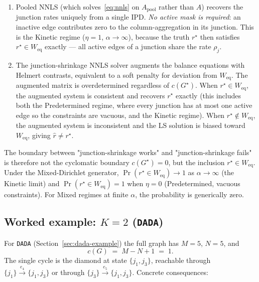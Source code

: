 \documentclass[11pt, a4paper]{article}
\newcommand{\rstar}{r^{\star}}
\newcommand{\Gstar}{G^{\star}}
\begin{document}
\begin{enumerate}[leftmargin=*, itemsep=2pt, topsep=2pt]
  \item Pooled NNLS (which solves~\eqref{eq:nnls} on $A_{\mathrm{pool}}$ rather than $A$) recovers the junction rates uniquely from a single IPD. \emph{No active mask is required}: an inactive edge contributes zero to the column-aggregation in its junction. This is the Kinetic regime ($\eta = 1$, $\alpha \to \infty$), because the truth $\rstar$ then satisfies $\rstar \in W_{\mathrm{eq}}$ exactly --- all active edges of a junction share the rate $\rho_j$.

  \item The junction-shrinkage NNLS solver augments the balance equations with Helmert contrasts, equivalent to a soft penalty for deviation from $W_{\mathrm{eq}}$. The augmented matrix is overdetermined regardless of $c(\Gstar)$. When $\rstar \in W_{\mathrm{eq}}$, the augmented system is consistent and recovers $\rstar$ exactly (this includes both the Predetermined regime, where every junction has at most one active edge so the constraints are vacuous, and the Kinetic regime). When $\rstar \notin W_{\mathrm{eq}}$, the augmented system is inconsistent and the LS solution is biased toward $W_{\mathrm{eq}}$, giving $\widehat{r} \neq \rstar$.
\end{enumerate}

The boundary between "junction-shrinkage works" and "junction-shrinkage fails" is therefore not the cyclomatic boundary $c(\Gstar) = 0$, but the inclusion $\rstar \in W_{\mathrm{eq}}$. Under the Mixed-Dirichlet generator, $\Pr(\rstar \in W_{\mathrm{eq}}) \to 1$ as $\alpha \to \infty$ (the Kinetic limit) and $\Pr(\rstar \in W_{\mathrm{eq}}) = 1$ when $\eta = 0$ (Predetermined, vacuous constraints). For Mixed regimes at finite $\alpha$, the probability is generically zero.

\subsection{Worked example: \texorpdfstring{$K = 2$ (\texttt{DADA})}{K=2 (DADA)}}

For \texttt{DADA} (Section~\ref{sec:dada-example}) the full graph has $M = 5$, $N = 5$, and
\[
c(G) \;=\; M - N + 1 \;=\; 1.
\]
The single cycle is the diamond at state $\{j_1, j_3\}$, reachable through $\{j_1\} \xrightarrow{e_4} \{j_1, j_3\}$ or through $\{j_3\} \xrightarrow{e_5} \{j_1, j_3\}$. Concrete consequences:
\end{document}
